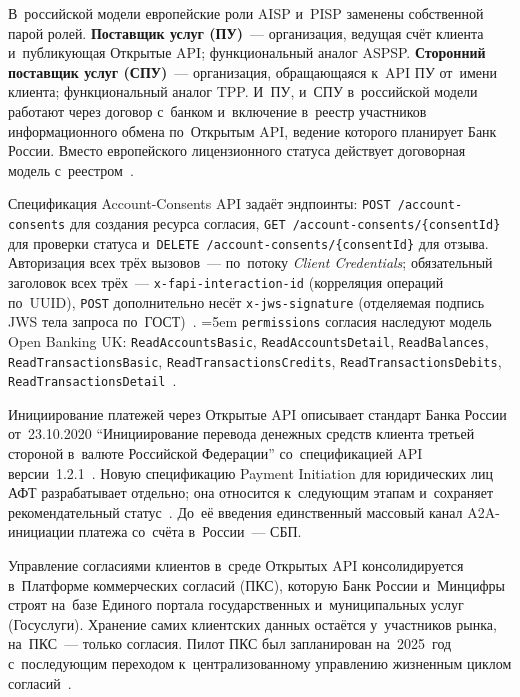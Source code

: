 В~российской модели европейские роли AISP и~PISP заменены собственной парой
ролей. \textbf{Поставщик услуг (ПУ)}~--- организация, ведущая счёт клиента
и~публикующая Открытые API; функциональный аналог ASPSP. \textbf{Сторонний
поставщик услуг (СПУ)}~--- организация, обращающаяся к~API ПУ от~имени клиента;
функциональный аналог TPP. И~ПУ, и~СПУ в~российской модели работают через
договор с~банком и~включение в~реестр участников информационного обмена
по~Открытым API, ведение которого планирует Банк России. Вместо европейского
лицензионного статуса действует договорная модель
с~реестром~\cite{cbr-open-api-stages-2024,openbankingrussia-wiki}.

Спецификация Account-Consents API задаёт эндпоинты: \texttt{POST
/account-consents} для создания ресурса согласия, \texttt{GET
/account-consents/\{consentId\}} для проверки статуса и~\texttt{DELETE
/account-consents/\{consentId\}} для отзыва. Авторизация всех трёх вызовов~---
по~потоку \textit{Client Credentials}; обязательный заголовок всех трёх~---
\texttt{x-fapi-interaction-id} (корреляция операций по~UUID), \texttt{POST}
дополнительно несёт \texttt{x-jws-signature} (отделяемая подпись JWS тела
запроса по~ГОСТ)~\cite{cbr-od-2895}. \begingroup\sloppy\emergencystretch=5em
\texttt{permissions} согласия наследуют модель Open
Banking UK: \texttt{ReadAccountsBasic}, \texttt{ReadAccountsDetail},
\texttt{ReadBalances}, \texttt{ReadTransactionsBasic},
\texttt{ReadTransactionsCredits}, \texttt{ReadTransactionsDebits},
\texttt{ReadTransactionsDetail}~\cite{cbr-od-2895}.\par\endgroup

Инициирование платежей через Открытые API описывает стандарт Банка России
от~23.10.2020 \enquote{Инициирование перевода денежных средств клиента третьей
стороной в~валюте Российской Федерации} со~спецификацией API
версии~1.2.1~\cite{cbr-open-api-payments-2020}. Новую спецификацию Payment
Initiation для юридических лиц АФТ разрабатывает отдельно; она относится
к~следующим этапам и~сохраняет рекомендательный
статус~\cite{openbankingrussia-wiki}. До~её
введения единственный массовый канал A2A-инициации платежа со~счёта
в~России~--- СБП.

Управление согласиями клиентов в~среде Открытых API консолидируется в~Платформе
коммерческих согласий (ПКС), которую Банк России и~Минцифры строят на~базе
Единого портала государственных и~муниципальных услуг (Госуслуги). Хранение
самих клиентских данных остаётся у~участников рынка, на~ПКС~--- только согласия.
Пилот ПКС был запланирован на~2025~год с~последующим переходом к~централизованному
управлению жизненным циклом
согласий~\cite{cbr-open-api-stages-2024,cbr-open-api}.

